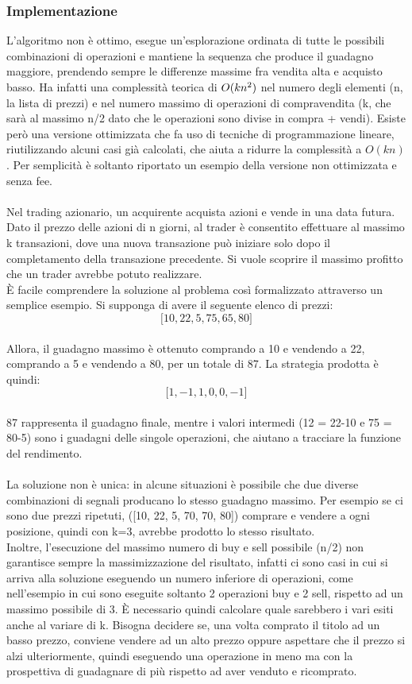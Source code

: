 \documentclass[a4paper,12pt]{report}
\begin{document}
\begin{fig}
\subsubsection{Implementazione}
L'algoritmo non è ottimo, esegue un'esplorazione ordinata di tutte le possibili combinazioni di operazioni e mantiene la sequenza che produce il guadagno maggiore, prendendo sempre le differenze massime fra vendita alta e acquisto basso. Ha infatti una complessità teorica di $O(k n\textsuperscript{2})$ nel numero degli elementi (n, la lista di prezzi) e nel numero massimo di operazioni di compravendita (k, che sarà al massimo n/2 dato che le operazioni sono divise in compra + vendi). Esiste però una versione ottimizzata che fa uso di tecniche di programmazione lineare, riutilizzando alcuni casi già calcolati, che aiuta a ridurre la complessità a $O(k n)$. Per semplicità è soltanto riportato un esempio della versione non ottimizzata e senza fee.\\~\\Nel trading azionario, un acquirente acquista azioni e vende in una data futura. Dato il prezzo delle azioni di n giorni, al trader è consentito effettuare al massimo k transazioni, dove una nuova transazione può iniziare solo dopo il completamento della transazione precedente. Si vuole scoprire il massimo profitto che un trader avrebbe potuto realizzare.\\ È facile comprendere la soluzione al problema così formalizzato attraverso un semplice esempio. Si supponga di avere il seguente elenco di prezzi:\\ \[\big[ 10, 22, 5, 75, 65, 80 \big]\]\\ Allora, il guadagno massimo è ottenuto comprando a 10 e vendendo a 22, comprando a 5 e vendendo a 80, per un totale di 87. La strategia prodotta è quindi:\\ \[\big[ 1, -1, 1, 0, 0, -1 \big]\]\\87 rappresenta il guadagno finale, mentre i valori intermedi (12 = 22-10 e 75 = 80-5) sono i guadagni delle singole operazioni, che aiutano a tracciare la funzione del rendimento.\\~\\
La soluzione non è unica: in alcune situazioni è possibile che due diverse combinazioni di segnali producano lo stesso guadagno massimo. Per esempio se ci sono due prezzi ripetuti, ([10, 22, 5, 70, 70, 80]) comprare e vendere a ogni posizione, quindi con k=3, avrebbe prodotto lo stesso risultato.\\
Inoltre, l'esecuzione del massimo numero di buy e sell possibile (n/2) non garantisce sempre la massimizzazione del risultato, infatti ci sono casi in cui si arriva alla soluzione eseguendo un numero inferiore di operazioni, come nell'esempio in cui sono eseguite soltanto 2 operazioni buy e 2 sell, rispetto ad un massimo possibile di 3. È necessario quindi calcolare quale sarebbero i vari esiti anche al variare di k. Bisogna decidere se, una volta comprato il titolo ad un basso prezzo, conviene vendere ad un alto prezzo oppure aspettare che il prezzo si alzi ulteriormente, quindi eseguendo una operazione in meno ma con la prospettiva di guadagnare di più rispetto ad aver venduto e ricomprato.\\~\\

\end{fig}
\end{document}
